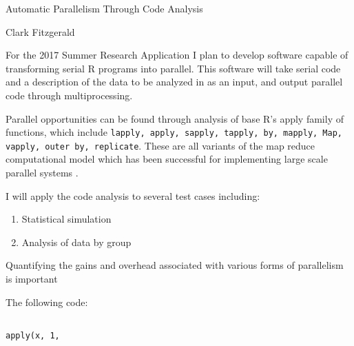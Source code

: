 \documentclass[12pt]{article}
\begin{document}
\begin{center}
    \large Automatic Parallelism Through Code Analysis 

    \normalsize Clark Fitzgerald
\end{center}

\vspace{3\baselineskip}

For the 2017 Summer Research Application I plan to develop software capable
of transforming serial R programs into parallel. This software will take
serial code and a description of the data to be analyzed in as an input,
and output parallel code through multiprocessing.

Parallel opportunities can be found through analysis of base R's apply family of functions,
which include \texttt{lapply, apply, sapply, tapply, by, mapply, Map, vapply, outer
by, replicate}. These are all variants of the map reduce computational model which
has been successful for implementing large scale parallel systems
\cite{dean2008mapreduce}.

I will apply the code analysis to several test cases including:
\begin{enumerate}
    \item Statistical simulation
    \item Analysis of data by group
\end{enumerate}

Quantifying the gains and overhead associated with various forms of
parallelism is important

The following code:

\begin{verbatim}

apply(x, 1, 

\end{verbatim}


 
\end{document}
